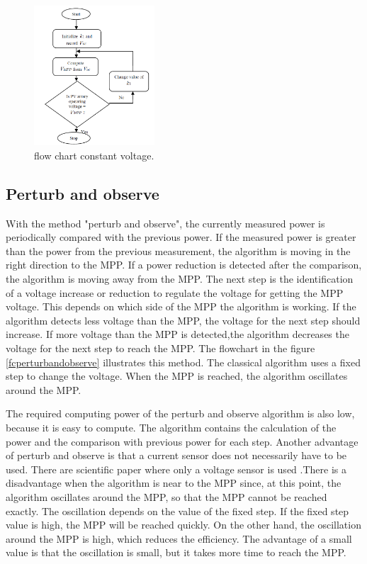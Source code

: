 \begin{figure}[H]
	\begin{center}
		\includegraphics[width=0.4\textwidth]{../Pictures/P1/Flow_chart/Flow_chart_constant_voltage}
		\caption{flow chart constant voltage\cite{flowchartVC}. }
		\label{fcconstantvoltage}
	\end{center}	
\end{figure}

\subsection{Perturb and observe}
With the method "perturb and observe", the currently measured power is periodically compared with the previous power. If the measured power is greater than the power from the previous measurement, the algorithm is moving in the right direction to the MPP. If a power reduction is detected after the comparison, the algorithm is moving away from the MPP. The next step is the identification of a voltage increase or reduction to regulate the voltage for getting the MPP voltage. This depends on which side of the MPP the algorithm is working. If the algorithm detects less voltage than the MPP, the voltage for the next step should increase. If more voltage than the MPP is detected,the algorithm decreases the voltage for the next step to reach the MPP.
The flowchart in the figure \ref{fcperturbandobserve} illustrates this method. The classical algorithm uses a fixed step to change the voltage. When the MPP is reached, the algorithm oscillates around the MPP\cite{flowchartVC}. 

The required computing power of the perturb and observe algorithm is also low, because it is easy to compute. The algorithm contains the calculation of the power and the comparison with previous power for each step. Another advantage of perturb and observe is that a current sensor does not necessarily have to be used. There are scientific paper where only a voltage sensor is used \cite{withoutcurrent}.There is a disadvantage when the algorithm is near to the MPP since, at this point, the algorithm oscillates around the MPP, so that the MPP cannot be reached exactly. The oscillation depends on the value of the fixed step. If the fixed step value is high, the MPP will be reached quickly. On the other hand, the oscillation around the MPP is high, which reduces the efficiency. The advantage of a small value is that the oscillation is small, but it takes more time to reach the MPP\cite{AN1521_MC}. 

